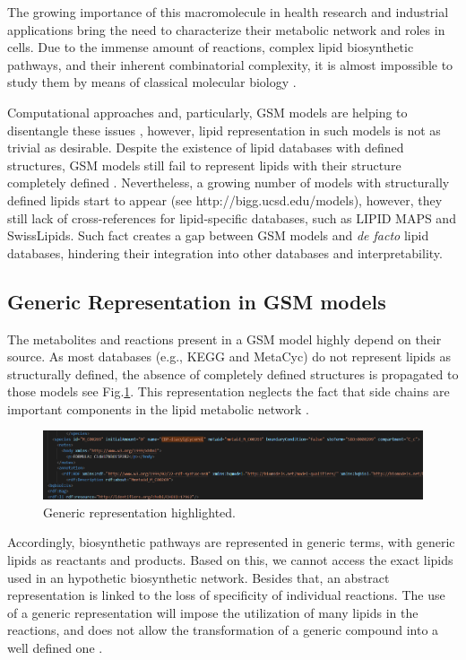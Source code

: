 \documentclass{llncs}
\begin{document}
The growing importance of this macromolecule in health research and industrial applications bring the need to characterize their metabolic network and roles in cells.
Due to the immense amount of reactions, complex lipid biosynthetic pathways, and their inherent combinatorial complexity, it is almost impossible to study them by means of classical molecular biology \cite{Schutzhold}.

Computational approaches and, particularly, GSM models are helping to disentangle these issues \cite{Schutzhold}, however, lipid representation in such models is not as trivial as desirable.
Despite the existence of lipid databases with defined structures, GSM models still fail to represent lipids with their structure completely defined \cite{Aung2013}. Nevertheless, a growing number of models with structurally defined lipids start to appear (see http://bigg.ucsd.edu/models), however, they still lack of cross-references for lipid-specific databases, such as LIPID MAPS and SwissLipids. Such fact creates a gap between GSM models and \textit{de facto} lipid databases, hindering their integration into other databases and interpretability.


\subsection{Generic Representation in GSM models}
The metabolites and reactions present in a GSM model highly depend on their source. As most databases (e.g., KEGG and MetaCyc) do not represent lipids as structurally defined, the absence of completely defined structures is propagated to those models see Fig.\ref{fig2}. 
This representation neglects the fact that side chains are important components in the lipid metabolic network \cite{Schutzhold,Aung2013,Sanchez2019}.

\begin{figure}
    \includegraphics[width=\textwidth]{imagens/generica.png}
    \caption{Generic representation highlighted.} \label{fig2}
\end{figure}

Accordingly, biosynthetic pathways are represented in generic terms, with generic lipids as reactants and products.
Based on this, we cannot access the exact lipids used in an hypothetic biosynthetic network.
Besides that, an abstract representation is linked to the loss of specificity of individual reactions. The use of a generic representation will impose the utilization of many lipids in the reactions, and does not allow the transformation of a generic compound into a well defined one \cite{Aung2013,Capela2022}.
\end{document}
